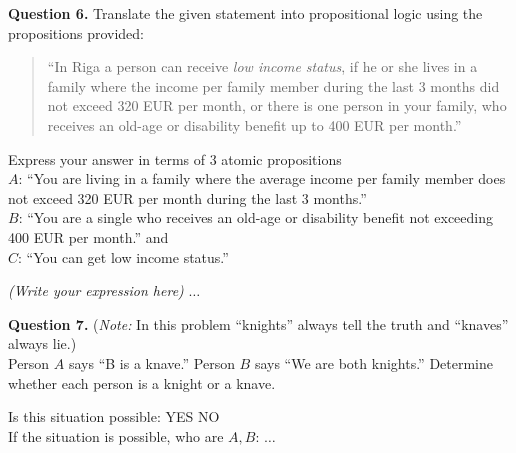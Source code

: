 \documentclass[jou]{apa6}
\begin{document}
\vspace{10pt}
{\bf Question 6.}
Translate the given statement into propositional logic using the propositions provided:
\begin{quote}
``In Riga a person can receive {\em low income status}, 
if he or she lives in a family where the income per family member during the last 3 months did not exceed 320 EUR per month, 
or there is one person in your family, who receives an old-age or disability benefit up to 400 EUR per month.''\\
\end{quote}
Express your answer in terms of $3$ atomic propositions\\
$A$: ``You are living in a family where the average income per family member does not exceed 320 EUR per month during
the last $3$ months.''\\
$B$: ``You are a single who receives an old-age or disability benefit not exceeding 400 EUR per month.'' and\\
$C$: ``You can get low income status.''

\vspace{3pt}
\noindent
{\em (Write your expression here)} $\ldots$


\vspace{10pt}
{\bf Question 7.} 
({\em Note:} In this problem ``knights'' always tell the truth and ``knaves'' always lie.)\\
Person $A$ says ``B is a knave.''
Person $B$ says ``We are both knights.'' Determine whether each person is a knight or a knave.

\vspace{3pt}
\noindent
Is this situation possible: \hspace{5ex} YES \hspace{5ex} NO\\
If the situation is possible, who are $A,B$: $\ldots$
\end{document}
